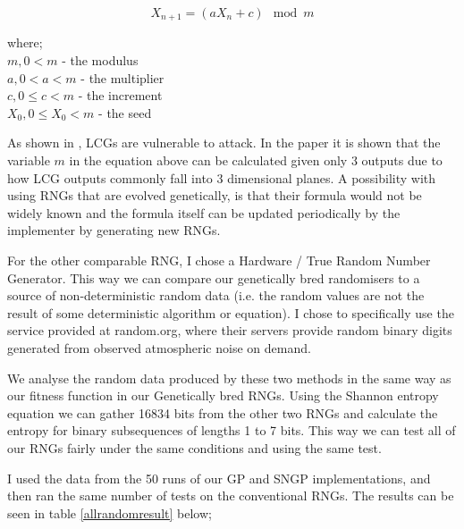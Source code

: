 \documentclass[a4paper,10.5pt]{article}
\begin{document}
\begin{center}
\noindent\begin{minipage}{.5\linewidth}
\begin{equation*}
X_{n+1} = (aX_n + c)\mod m
\end{equation*}
\end{minipage}%
\begin{minipage}{.4\linewidth}
where;\\
$m, 0 < m$ - the modulus\\
$a, 0 < a < m$ - the multiplier\\
$c, 0 \leq c < m$ - the increment\\
$X_0, 0 \leq X_0 < m$ - the seed
\end{minipage}
\end{center}

As shown in \cite{lcghack}, LCGs are vulnerable to attack. In the paper it is shown that the variable $m$ in the equation above can be calculated given only 3 outputs due to how LCG outputs commonly fall into 3 dimensional planes. A possibility with using RNGs that are evolved genetically, is that their formula would not be widely known and the formula itself can be updated periodically by the implementer by generating new RNGs.

For the other comparable RNG, I chose a Hardware / True Random Number Generator. This way we can compare our genetically bred randomisers to a source of non-deterministic random data (i.e. the random values are not the result of some deterministic algorithm or equation). I chose to specifically use the service provided at random.org, where their servers provide random binary digits generated from observed atmospheric noise on demand. 

We analyse the random data produced by these two methods in the same way as our fitness function in our Genetically bred RNGs. Using the Shannon entropy equation we can gather 16834 bits from the other two RNGs and calculate the entropy for binary subsequences of lengths 1 to 7 bits. This way we can test all of our RNGs fairly under the same conditions and using the same test.

I used the data from the 50 runs of our GP and SNGP implementations, and then ran the same number of tests on the conventional RNGs. The results can be seen in table \ref{allrandomresult} below;
\end{document}
